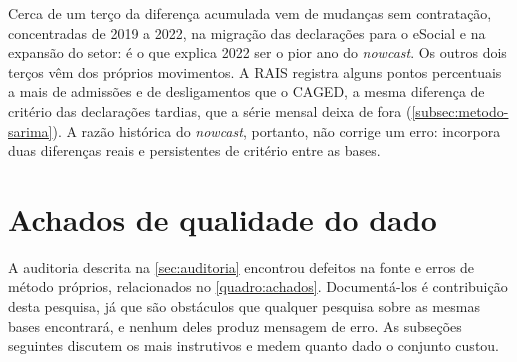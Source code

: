 


Cerca de um terço da diferença acumulada vem de mudanças sem contratação, concentradas de 2019 a 2022, na migração das declarações para o eSocial e na expansão do setor: é o que explica 2022 ser o pior ano do \textit{nowcast}. Os outros dois terços vêm dos próprios movimentos. A RAIS registra alguns pontos percentuais a mais de admissões e de desligamentos que o CAGED, a mesma diferença de critério das declarações tardias, que a série mensal deixa de fora (\autoref{subsec:metodo-sarima}). A razão histórica do \textit{nowcast}, portanto, não corrige um erro: incorpora duas diferenças reais e persistentes de critério entre as bases.

\section{Achados de qualidade do dado}
\label{sec:achados-qualidade}

A auditoria descrita na \autoref{sec:auditoria} encontrou defeitos na fonte e erros de método próprios, relacionados no \autoref{quadro:achados}. Documentá-los é contribuição desta pesquisa, já que são obstáculos que qualquer pesquisa sobre as mesmas bases encontrará, e nenhum deles produz mensagem de erro. As subseções seguintes discutem os mais instrutivos e medem quanto dado o conjunto custou.

